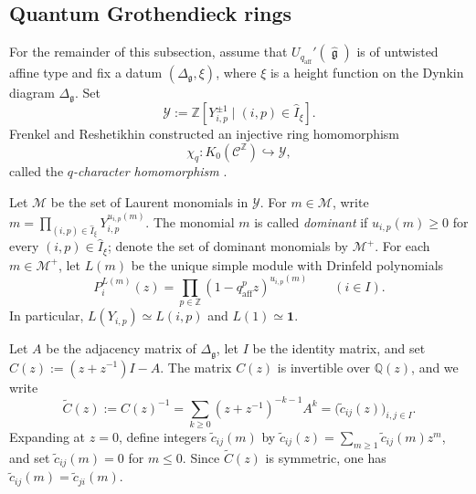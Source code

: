 \documentclass[12pt, reqno]{amsart}
\theoremstyle{plain}
\theoremstyle{definition}
\numberwithin{equation}{section}
\newcommand{\ZZ}{\mathbb{Z}}
\newcommand{\QQ}{\mathbb{Q}}
\newcommand{\qaff}{q_{\mathrm{aff}}}
\newcommand{\fg}{\operatorname{\mathfrak{g}}}
\begin{document}
\subsection{Quantum Grothendieck rings}

For the remainder of this subsection, assume that
\(U_{\qaff}'(\widehat{\fg})\) is of untwisted affine type and fix a datum
\((\Delta_{\fg},\xi)\), where \(\xi\) is a height function on the
Dynkin diagram \(\Delta_{\fg}\). Set
\begin{equation}\label{eq:Y-Laurent-ring}
    \mathcal Y
    :=\ZZ[Y_{i,p}^{\pm1}\mid(i,p)\in\widehat I_\xi].
\end{equation}
Frenkel and Reshetikhin constructed an injective ring homomorphism
\begin{equation}\label{eq:q-character-homomorphism}
    \chi_q\colon K_0(\mathscr C^{\ZZ})\hookrightarrow\mathcal Y,
\end{equation}
called the \emph{\(q\)-character homomorphism}
\cite{frenkel1999qcharacters}.

Let \(\mathcal M\) be the set of Laurent monomials in \(\mathcal Y\). For
\(m\in\mathcal M\), write
\(m=\prod_{(i,p)\in\widehat I_\xi}Y_{i,p}^{u_{i,p}(m)}\). The monomial
\(m\) is called \emph{dominant} if \(u_{i,p}(m)\geq0\) for every
\((i,p)\in\widehat I_\xi\); denote the set of dominant monomials by
\(\mathcal M^+\). For each \(m\in\mathcal M^+\), let \(L(m)\) be the
unique simple module with Drinfeld polynomials
\begin{equation}\label{eq:Drinfeld-polynomials-dominant-monomial}
    P_i^{L(m)}(z)
    =\prod_{p\in\ZZ}(1-q_{\mathrm{aff}}^p z)^{u_{i,p}(m)}
    \qquad (i\in I).
\end{equation}
In particular, \(L(Y_{i,p})\simeq L(i,p)\) and
\(L(1)\simeq\mathbf1\).

Let \(A\) be the adjacency matrix of \(\Delta_{\fg}\), let \(I\) be the identity
matrix, and set \(C(z):=(z+z^{-1})I-A\). The matrix \(C(z)\) is
invertible over \(\QQ(z)\), and we write
\begin{equation}\label{eq:inverse-quantum-Cartan-matrix}
    \widetilde C(z)
    :=C(z)^{-1}
    =\sum_{k\geq0}(z+z^{-1})^{-k-1}A^k
    =\bigl(\widetilde c_{ij}(z)\bigr)_{i,j\in I}.
\end{equation}
Expanding at \(z=0\), define integers \(\widetilde c_{ij}(m)\) by
\(\widetilde c_{ij}(z)=\sum_{m\geq1}\widetilde c_{ij}(m)z^m\), and set
\(\widetilde c_{ij}(m)=0\) for \(m\leq0\). Since
\(\widetilde C(z)\) is symmetric, one has
\(\widetilde c_{ij}(m)=\widetilde c_{ji}(m)\).
\end{document}
